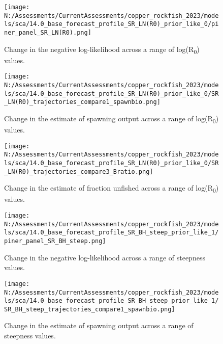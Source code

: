\documentclass[11pt,
  english,
  letterpaper,
]{article}
\begin{document}
\begin{figure}
\centering
\texttt{[image: N:/Assessments/CurrentAssessments/copper\_rockfish\_2023/models/sca/14.0\_base\_forecast\_profile\_SR\_LN(R0)\_prior\_like\_0/piner\_panel\_SR\_LN(R0).png]}
\caption{Change in the negative log-likelihood across a range of log(R\textsubscript{0}) values.\label{fig:r0-profile}}
\end{figure}

\pagebreak

\begin{figure}
\centering
\texttt{[image: N:/Assessments/CurrentAssessments/copper\_rockfish\_2023/models/sca/14.0\_base\_forecast\_profile\_SR\_LN(R0)\_prior\_like\_0/SR\_LN(R0)\_trajectories\_compare1\_spawnbio.png]}
\caption{Change in the estimate of spawning output across a range of log(R\textsubscript{0}) values.\label{fig:r0-ssb}}
\end{figure}

\pagebreak

\begin{figure}
\centering
\texttt{[image: N:/Assessments/CurrentAssessments/copper\_rockfish\_2023/models/sca/14.0\_base\_forecast\_profile\_SR\_LN(R0)\_prior\_like\_0/SR\_LN(R0)\_trajectories\_compare3\_Bratio.png]}
\caption{Change in the estimate of fraction unfished across a range of log(R\textsubscript{0}) values.\label{fig:r0-depl}}
\end{figure}

\pagebreak

\begin{figure}
\centering
\texttt{[image: N:/Assessments/CurrentAssessments/copper\_rockfish\_2023/models/sca/14.0\_base\_forecast\_profile\_SR\_BH\_steep\_prior\_like\_1/piner\_panel\_SR\_BH\_steep.png]}
\caption{Change in the negative log-likelihood across a range of steepness values.\label{fig:h-profile}}
\end{figure}

\pagebreak

\begin{figure}
\centering
\texttt{[image: N:/Assessments/CurrentAssessments/copper\_rockfish\_2023/models/sca/14.0\_base\_forecast\_profile\_SR\_BH\_steep\_prior\_like\_1/SR\_BH\_steep\_trajectories\_compare1\_spawnbio.png]}
\caption{Change in the estimate of spawning output across a range of steepness values.\label{fig:h-ssb}}
\end{figure}
\end{document}
